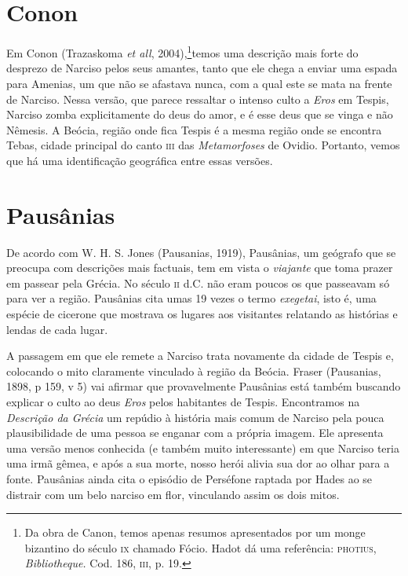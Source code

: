 \section{Conon}

Em Conon (Trazaskoma \emph{et all}, 2004),\footnote{ Da
obra de Canon, temos apenas resumos apresentados por um monge
bizantino do século \textsc{ix} chamado Fócio. Hadot dá uma referência:
\textsc{photius}, \emph{Bibliotheque.} Cod. 186, \textsc{iii}, p. 19.}temos uma
descrição mais forte do desprezo de Narciso pelos seus amantes, tanto
que ele chega a enviar uma espada para Amenias, um que não se
afastava nunca, com a qual este se mata na frente de Narciso. Nessa
versão, que parece ressaltar o intenso culto a \emph{Eros} em
Tespis, Narciso zomba explicitamente do deus do amor, e é esse deus
que se vinga e não Nêmesis. A Beócia, região onde fica Tespis é a
mesma região onde se encontra Tebas, cidade principal do canto
\textsc{iii}
das \emph{Metamorfoses} de Ovidio. Portanto, vemos que há uma
identificação geográfica entre essas versões.

\section{Pausânias}

De acordo com W. H. S. Jones (Pausanias, 1919), Pausânias, um
geógrafo que se preocupa com descrições mais factuais, tem em vista o
\emph{viajante} que toma prazer em passear pela Grécia. No século
\textsc{ii}
d.C. não eram poucos os que passeavam só para ver a região. Pausânias
cita umas 19 vezes o termo \emph{exegetai}, isto é, uma espécie de
cicerone que mostrava os lugares aos visitantes relatando as
histórias e lendas de cada lugar. 

A passagem em que ele remete a Narciso trata novamente da cidade de
Tespis e, colocando o mito claramente vinculado à região da Beócia.
Fraser (Pausanias, 1898, p 159, v 5) vai afirmar que provavelmente
Pausânias está também buscando explicar o culto ao deus \emph{Eros}
pelos habitantes de Tespis. Encontramos na \emph{Descrição da
Grécia} um repúdio à história mais comum de Narciso pela pouca
plausibilidade de uma pessoa se enganar com a própria imagem. Ele
apresenta uma versão menos conhecida (e também muito interessante) em
que Narciso teria uma irmã gêmea, e após a sua morte, nosso herói
alivia sua dor ao olhar para a fonte. Pausânias ainda cita o episódio
de Perséfone raptada por Hades ao se distrair com um belo narciso em
flor, vinculando assim os dois mitos.

